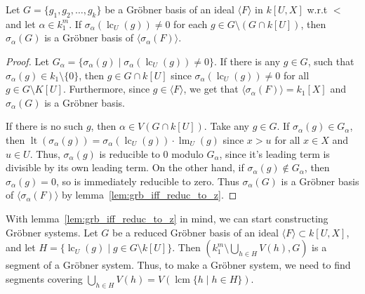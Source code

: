 \documentclass[a4paper, 12pt]{article}
\DeclareMathOperator{\LT}{lt}
\DeclareMathOperator{\LM}{lm}
\DeclareMathOperator{\LC}{lc}
\DeclareMathOperator{\lcm}{lcm}
\theoremstyle{changedot}
\theoremstyle{changedotbreak}
\theoremstyle{nonumberplain}
\newtheorem{proof}{Proof}
\begin{document}


\begin{lemma}
  Let $G = \{g_{1}, g_{2}, \dots, g_{k}\}$ be a Gröbner basis of an ideal $\langle F \rangle$ in $k[U, X]$ w.r.t $<$ and let $\alpha \in k_{1}^{m}$. If $\sigma_{\alpha}(\LC_{U}(g)) \neq 0$ for each $g \in G \setminus (G \cap k[U])$, then $\sigma_{\alpha}(G)$ is a Gröbner basis of $\langle \sigma_{\alpha}(F) \rangle$.
\end{lemma}
\begin{proof}
  Let $G_{\alpha} = \{\sigma_{\alpha}(g) \mid \sigma_{\alpha}(\LC_{U}(g)) \neq 0\}$. If there is any $g \in G$, such that $\sigma_{\alpha}(g) \in k_{1} \setminus \{0\}$, then $g \in G \cap k[U]$ since $\sigma_{\alpha}(\LC_{U}(g)) \neq 0$ for all $g \in G \setminus K[U]$. Furthermore, since $g \in \langle F \rangle$, we get that $\langle \sigma_{\alpha}(F) \rangle = k_{1}[X]$ and $\sigma_{\alpha}(G)$ is a Gröbner basis.

  If there is no such $g$, then $\alpha \in V(G \cap k[U])$. Take any $g \in G$. If $\sigma_{\alpha}(g) \in G_{\alpha}$, then $\LT(\sigma_{\alpha}(g)) = \sigma_{\alpha}(\LC_{U}(g)) \cdot \LM_{U}(g)$ since $x > u$ for all $x \in X$ and $u \in U$. Thus, $\sigma_{\alpha}(g)$ is reducible to $0$ modulo $G_{\alpha}$, since it's leading term is divisible by its own leading term.  On the other hand, if $\sigma_{\alpha}(g) \notin G_{\alpha}$, then $\sigma_{\alpha}(g) = 0$, so is immediately reducible to zero. Thus $\sigma_{\alpha}(G)$ is a Gröbner basis of $\langle \sigma_{\alpha}(F) \rangle$ by lemma~\ref{lem:grb_iff_reduc_to_z}.
\end{proof}

With lemma~\ref{lem:grb_iff_reduc_to_z} in mind, we can start constructing Gröbner systems. Let $G$ be a reduced Gröbner basis of an ideal $\langle F \rangle \subset k[U, X]$, and let $H = \{\LC_{U}(g) \mid g \in G \setminus k[U]\}$. Then $\left(k_{1}^{m} \setminus \bigcup_{h \in H} V(h), G\right)$ is a segment of a Gröbner system. Thus, to make a Gröbner system, we need to find segments covering $\bigcup_{h \in H} V(h) = V(\lcm\{h \mid h \in H\})$.
\end{document}

